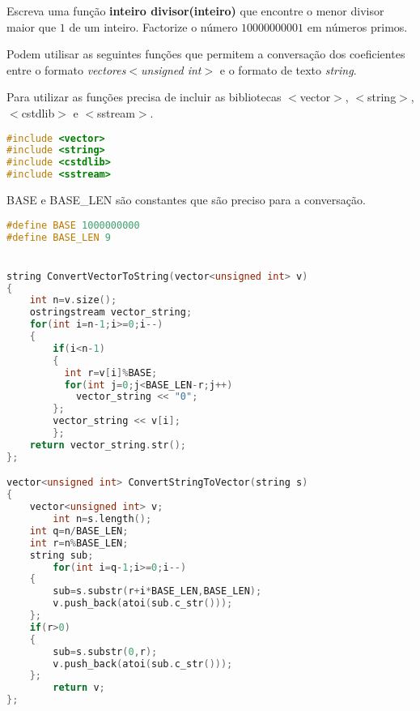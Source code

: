 \nextexer{} Escreva uma função {\bf inteiro divisor(inteiro)} que encontre o menor divisor maior que $1$ de um inteiro. Factorize o número $10000000001$ em números primos.
\newpage



Podem utilisar as seguintes funções que permitem a conversação dos coeficientes entre o formato {\it vectores$<$unsigned int$>$} e o formato de texto {\it string}.

Para utilizar as funções precisa de incluir as bibliotecas $<$vector$>$, $<$string$>$, $<$cstdlib$>$ e $<$sstream$>$.

\begin{lstlisting}[language=C++]
#include <vector>
#include <string>
#include <cstdlib>
#include <sstream>
\end{lstlisting}

BASE e BASE\_LEN são constantes que são preciso para a conversação.
\begin{lstlisting}[language=C++]
#define BASE 1000000000
#define BASE_LEN 9


string ConvertVectorToString(vector<unsigned int> v)
{
	int n=v.size();
	ostringstream vector_string;
	for(int i=n-1;i>=0;i--)
	{
		if(i<n-1)
		{
		  int r=v[i]%BASE;
		  for(int j=0;j<BASE_LEN-r;j++)
			vector_string << "0";
		};
		vector_string << v[i];
        };
	return vector_string.str();
};

vector<unsigned int> ConvertStringToVector(string s)
{
	vector<unsigned int> v;
        int n=s.length();
	int q=n/BASE_LEN;
	int r=n%BASE_LEN;
	string sub;
        for(int i=q-1;i>=0;i--)
	{
		sub=s.substr(r+i*BASE_LEN,BASE_LEN);				
		v.push_back(atoi(sub.c_str()));
	};
	if(r>0)
	{ 
		sub=s.substr(0,r);
		v.push_back(atoi(sub.c_str()));
	};
        return v;
};
\end{lstlisting}








